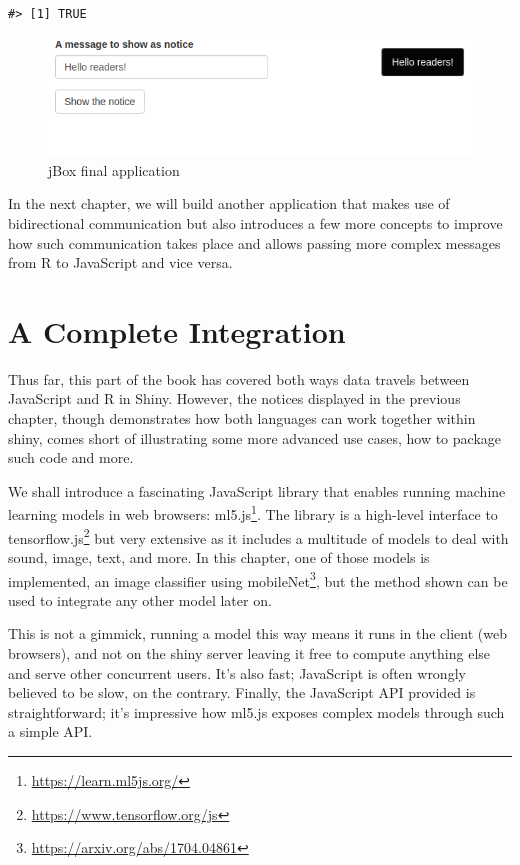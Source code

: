 \documentclass[
]{krantz}
\renewcommand{\href}[2]{#2\footnote{\url{#1}}}
\begin{document}
\begin{verbatim}
#> [1] TRUE
\end{verbatim}

\begin{figure}[t]

{\centering \includegraphics[width=1\linewidth]{images/jbox-end} 

}

\caption{jBox final application}\label{fig:jbox-end}
\end{figure}

In the next chapter, we will build another application that makes use of bidirectional communication but also introduces a few more concepts to improve how such communication takes place and allows passing more complex messages from R to JavaScript and vice versa.

\hypertarget{shiny-complete}{%
\chapter{A Complete Integration}\label{shiny-complete}}

Thus far, this part of the book has covered both ways data travels between JavaScript and R in Shiny. However, the notices displayed in the previous chapter, though demonstrates how both languages can work together within shiny, comes short of illustrating some more advanced use cases, how to package such code and more.

We shall introduce a fascinating JavaScript library that enables running machine learning models in web browsers: \href{https://learn.ml5js.org/}{ml5.js}. The library is a high-level interface to \href{https://www.tensorflow.org/js}{tensorflow.js} but very extensive as it includes a multitude of models to deal with sound, image, text, and more. In this chapter, one of those models is implemented, an image classifier using \href{https://arxiv.org/abs/1704.04861}{mobileNet}, but the method shown can be used to integrate any other model later on.

This is not a gimmick, running a model this way means it runs in the client (web browsers), and not on the shiny server leaving it free to compute anything else and serve other concurrent users. It's also fast; JavaScript is often wrongly believed to be slow, on the contrary. Finally, the JavaScript API provided is straightforward; it's impressive how ml5.js exposes complex models through such a simple API.
\end{document}

